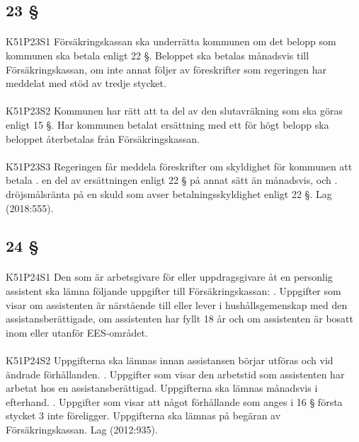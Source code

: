 \documentclass[a4paper,notitlepage,openany,10pt]{book}
\begin{document}
\subsection*{23 §}
\paragraph*{}
{\tiny K51P23S1}
Försäkringskassan ska underrätta kommunen om det belopp som kommunen ska betala enligt 22 §. Beloppet ska betalas månadsvis till Försäkringskassan, om inte annat följer av föreskrifter som regeringen har meddelat med stöd av tredje stycket.
\paragraph*{}
{\tiny K51P23S2}
Kommunen har rätt att ta del av den slutavräkning som ska göras enligt 15 §. Har kommunen betalat ersättning med ett för högt belopp ska beloppet återbetalas från Försäkringskassan.
\paragraph*{}
{\tiny K51P23S3}
Regeringen får meddela föreskrifter om skyldighet för kommunen att betala
. en del av ersättningen enligt 22 § på annat sätt än månadsvis, och
. dröjsmålsränta på en skuld som avser betalningsskyldighet enligt 22 §.
Lag (2018:555).
\subsection*{24 §}
\paragraph*{}
{\tiny K51P24S1}
Den som är arbetsgivare för eller uppdragsgivare åt en personlig assistent ska lämna följande uppgifter till Försäkringskassan:
. Uppgifter som visar om assistenten är närstående till eller lever i hushållsgemenskap med den assistansberättigade, om assistenten har fyllt 18 år och om assistenten är bosatt inom eller utanför EES-området.
\paragraph*{}
{\tiny K51P24S2}
Uppgifterna ska lämnas innan assistansen börjar utföras och vid ändrade förhållanden.
. Uppgifter som visar den arbetstid som assistenten har arbetat hos en assistansberättigad. Uppgifterna ska lämnas månadsvis i efterhand.
. Uppgifter som visar att något förhållande som anges i 16 § första stycket 3 inte föreligger. Uppgifterna ska lämnas på begäran av Försäkringskassan.
Lag (2012:935).
\end{document}
